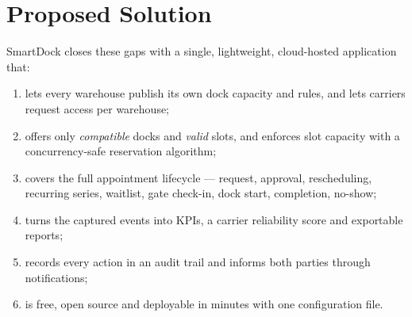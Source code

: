 \section{Proposed Solution}
SmartDock closes these gaps with a single, lightweight, cloud-hosted application that:
\begin{enumerate}
  \item lets every warehouse publish its own dock capacity and rules, and lets carriers request access per warehouse;
  \item offers only \emph{compatible} docks and \emph{valid} slots, and enforces slot capacity with a concurrency-safe reservation algorithm;
  \item covers the full appointment lifecycle --- request, approval, rescheduling, recurring series, waitlist, gate check-in, dock start, completion, no-show;
  \item turns the captured events into KPIs, a carrier reliability score and exportable reports;
  \item records every action in an audit trail and informs both parties through notifications;
  \item is free, open source and deployable in minutes with one configuration file.
\end{enumerate}
